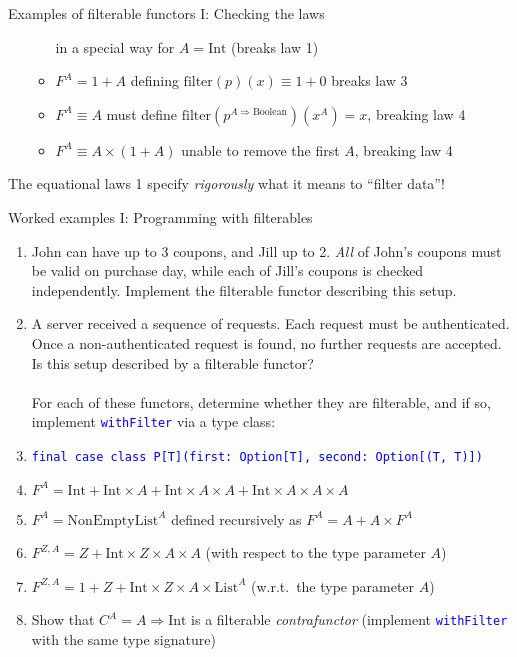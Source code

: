 \documentclass[english]{beamer}
\begin{document}
\begin{frame}{Examples of filterable functors I: Checking the laws}
\begin{itemize}
\begin{itemize}
in a special way for $A=\text{Int}$ (breaks law 1)
\item $F^{A}=1+A$ defining $\text{filter}\left(p\right)\left(x\right)\equiv1+0$
breaks law 3
\item $F^{A}\equiv A$ \textendash{} must define $\text{filter}\left(p^{A\Rightarrow\text{Boolean}}\right)\left(x^{A}\right)=x$,
breaking law 4
\item $F^{A}\equiv A\times\left(1+A\right)$ \textendash{} unable to remove
the first $A$, breaking law 4
\end{itemize}
\end{itemize}
The equational laws 1 specify \emph{rigorously} what
it means to ``filter data''!
\end{frame}

\begin{frame}{Worked examples I: Programming with filterables}
\begin{enumerate}
\item John can have up to 3 coupons, and Jill up to 2. \emph{All} of John's
coupons must be valid on purchase day, while each of Jill's coupons
is checked independently. Implement the filterable functor describing
this setup.
\item A server received a sequence of requests. Each request must be authenticated.
Once a non-authenticated request is found, no further requests are
accepted. Is this setup described by a filterable functor?\\
\ \\
For each of these functors, determine whether they are filterable,
and if so, implement \texttt{\textcolor{blue}{\footnotesize{}withFilter}}
via a type class:
\item \texttt{\textcolor{blue}{\footnotesize{}final case class P{[}T{]}(first:\ Option{[}T{]},
second:\  Option{[}(T, T){]})}}{\footnotesize \par}
\item $F^{A}=\text{Int}+\text{Int}\times A+\text{Int}\times A\times A+\text{Int}\times A\times A\times A$
\item $F^{A}=\text{NonEmptyList}^{A}$ defined recursively as $F^{A}=A+A\times F^{A}$ 
\item $F^{Z,A}=Z+\text{Int}\times Z\times A\times A$ (with respect to the
type parameter $A$)
\item $F^{Z,A}=1+Z+\text{Int}\times Z\times A\times\text{List}^{A}$ (w.r.t.\ the
type parameter $A$)
\item Show that $C^{A}=A\Rightarrow\text{Int}$ is a filterable \emph{contrafunctor}
(implement \texttt{\textcolor{blue}{\footnotesize{}withFilter}} with
the same type signature)
\end{enumerate}
\end{frame}
\end{document}
